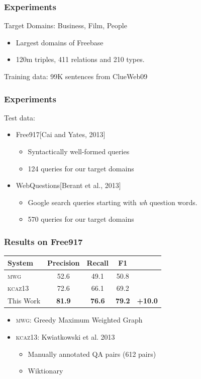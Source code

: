 \documentclass[mathserif,12pt]{beamer}
\newcommand \kcaz{\textsc{kcaz13}\xspace}
\newcommand \mwg{\textsc{mwg}\xspace}
\newcommand{\hlight}[1]{{\color{blue!80} #1}}
\newcommand \free{Free917\xspace}
\newcommand \webq{WebQuestions\xspace}
\begin{document}
\begin{frame}
\frametitle{Experiments}
 \hlight{Target Domains:}  Business, Film, People 
  \begin{itemize}
    \item Largest domains of Freebase
    \item 120m triples, 411 relations and 210 types.
  \end{itemize}
  
  \vspace{1em}
  \hlight{Training data:} 99K sentences from ClueWeb09
\end{frame}


\begin{frame}
\frametitle{Experiments}

  \hlight{Test data:} 
  \begin{itemize}
  	\item \free [Cai and Yates, 2013] 
  	\begin{itemize}
  	 \item Syntactically well-formed queries
  	 \item 124 queries for our target domains
  	\end{itemize}

  	\item \webq [Berant et al., 2013] 
  	\begin{itemize}
	  \item Google search queries starting with \textit{wh} question words.
	  \item 570 queries for our target domains
	\end{itemize}
  \end{itemize}

\end{frame}

\begin{frame}
\frametitle{Results on \free}

\begin{table}
\begin{tabular}{|l| c c c c|}
  \hline
  System  & Precision & Recall & F1 &  \\
  \hline
  \textsc{mwg} & 52.6 & 49.1 & 50.8 & \\
   \kcaz & 72.6 & 66.1 & 69.2 & \\
   This Work  & \bf 81.9 & \bf  76.6 & \bf 79.2 & \color{blue} \bf +10.0 \\
   \hline
\end{tabular}
\end{table}

\begin{itemize}
  \item {\color{blue!70} \mwg:} Greedy Maximum Weighted Graph
  \item {\color{blue!70} \kcaz:} Kwiatkowski et al. 2013 
  \begin{itemize}
    \item Manually annotated QA pairs (612 pairs)
    \item Wiktionary
  \end{itemize}
\end{itemize}
\end{frame}
\end{document}
